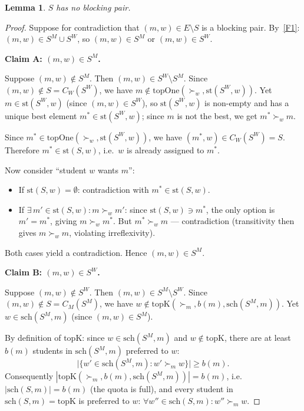\documentclass[12pt, a4paper]{article}
\theoremstyle{definition}
\theoremstyle{plain}
\newtheorem{lemma}[definition]{Lemma}
\theoremstyle{remark}
\newcommand{\CM}{C_M}
\newcommand{\CW}{C_W}
\newcommand{\SM}{S^M}
\newcommand{\SW}{S^W}
\newcommand{\school}[2]{\mathrm{sch}(#1,#2)}
\newcommand{\stud}[2]{\mathrm{st}(#1,#2)}
\newcommand{\topK}{\mathrm{topK}}
\newcommand{\topOne}{\mathrm{topOne}}
\newcommand{\quota}{b}
\begin{document}
\begin{lemma}
\label{lem:no_block}
$S$ has no blocking pair.
\end{lemma}
\begin{proof}
Suppose for contradiction that $(m, w) \in E \setminus S$ is a blocking pair.
By~\eqref{F1}: $(m, w) \in \SM \cup \SW$, so $(m, w) \in \SM$ or
$(m, w) \in \SW$.

\medskip
\noindent\textbf{Claim A: $(m, w) \in \SM$.}

Suppose $(m, w) \notin \SM$. Then $(m, w) \in \SW \setminus \SM$.
Since $(m, w) \notin S = \CW(\SW)$, we have
$m \notin \topOne(\succ_w, \stud{\SW}{w})$.
Yet $m \in \stud{\SW}{w}$ (since $(m, w) \in \SW$), so $\stud{\SW}{w}$
is non-empty and has a unique best element $m^* \in \stud{\SW}{w}$; since $m$
is not the best, we get $m^* \succ_w m$.

Since $m^* \in \topOne(\succ_w, \stud{\SW}{w})$, we have
$(m^*, w) \in \CW(\SW) = S$.
Therefore $m^* \in \stud{S}{w}$, i.e.\ $w$ is already assigned to $m^*$.

Now consider ``student $w$ wants $m$'':
\begin{itemize}
  \item If $\stud{S}{w} = \emptyset$: contradiction with $m^* \in \stud{S}{w}$.
  \item If $\exists\, m' \in \stud{S}{w} : m \succ_w m'$: since
    $\stud{S}{w} \ni m^*$, the only option is $m' = m^*$, giving
    $m \succ_w m^*$. But $m^* \succ_w m$ --- contradiction (transitivity
    then gives $m \succ_w m$, violating irreflexivity).
\end{itemize}
Both cases yield a contradiction. Hence $(m, w) \in \SM$.

\medskip
\noindent\textbf{Claim B: $(m, w) \in \SW$.}

Suppose $(m, w) \notin \SW$. Then $(m, w) \in \SM \setminus \SW$.
Since $(m, w) \notin S = \CM(\SM)$, we have
$w \notin \topK(\succ_m, \quota(m), \school{\SM}{m})$.
Yet $w \in \school{\SM}{m}$ (since $(m, w) \in \SM$).

By definition of $\topK$: since $w \in \school{\SM}{m}$ and $w \notin \topK$,
there are at least $\quota(m)$ students in $\school{\SM}{m}$ preferred to $w$:
\[
  \bigl|\{w' \in \school{\SM}{m} : w' \succ_m w\}\bigr| \geq \quota(m).
\]
Consequently $|\topK(\succ_m, \quota(m), \school{\SM}{m})| = \quota(m)$,
i.e.\ $|\school{S}{m}| = \quota(m)$ (the quota is full), and every student
in $\school{S}{m} = \topK$ is preferred to $w$:
$\forall w'' \in \school{S}{m} : w'' \succ_m w$.


\end{proof}
\end{document}

